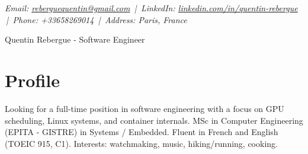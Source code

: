 \documentclass[9pt,a4paper]{article}
\newcommand{\namefont}{\fontsize{18}{22}\selectfont}
\newcommand{\tinyscript}{\fontsize{8}{8}\selectfont}
\begin{document}
\renewcommand\normalsize{\fontsize{10.5}{15}\selectfont}
\normalsize

\begin{center}
  {\tinyscript\itshape
  Email: \href{mailto:reberguequentin@gmail.com}{reberguequentin@gmail.com} \,|\,
  LinkedIn: \href{https://linkedin.com/in/quentin-rebergue}{linkedin.com/in/quentin-rebergue} \,|\,
  Phone: +33658269014 \,|\,
  Address: Paris, France}
\end{center}

\begin{center}
  {\namefont Quentin Rebergue - Software Engineer}
\end{center}

\section*{Profile}
\begin{tcolorbox}[mybox2]
Looking for a full-time position in software engineering with a focus on GPU scheduling, Linux systems, and container internals. MSc in Computer Engineering (EPITA - GISTRE) in Systems / Embedded. Fluent in French and English (TOEIC 915, C1). Interests: watchmaking, music, hiking/running, cooking.
\end{tcolorbox}
\end{document}
